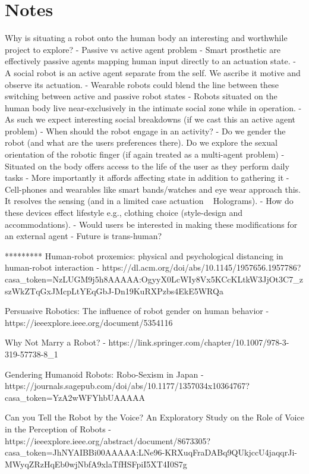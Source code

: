 \section{Notes}

Why is situating a robot onto the human body an interesting and worthwhile project to explore?
- Passive vs active agent problem
    - Smart prosthetic are effectively passive agents mapping human input directly to an actuation state.
    - A social robot is an active agent separate from the self. We ascribe it motive and observe its actuation. 
    - Wearable robots could blend the line between these switching between active and passive robot states
- Robots situated on the human body live near-exclusively in the intimate social zone while in operation.
    - As such we expect interesting social breakdowns (if we cast this an active agent problem)
        - When should the robot engage in an activity? 
    - Do we gender the robot (and what are the users preferences there). Do we explore the sexual orientation of the robotic finger (if again treated as a multi-agent problem)
- Situated on the body offers access to the life of the user as they perform daily tasks
    - More importantly it affords affecting state in addition to gathering it
    - Cell-phones and wearables like smart bands/watches and eye wear approach this. It resolves the sensing (and in a limited case actuation ~ Holograms).
- How do these devices effect lifestyle e.g., clothing choice (style-design and accommodations). 
    - Would users be interested in making these modifications for an external agent
- Future is trans-human?

********* Human-robot proxemics: physical and psychological distancing in human-robot interaction - https://dl.acm.org/doi/abs/10.1145/1957656.1957786?casa_token=NzLUGM9j5h8AAAAA:OgyyX0LcWIy8Vx5KCcKLtkW3JjOt3C7_zszWkZTqGxJMcpLtYEqGbJ-Dn19KuRXPzbs4EkE5WRQa


Persuasive Robotics: The influence of robot gender on human behavior - https://ieeexplore.ieee.org/document/5354116

Why Not Marry a Robot? - https://link.springer.com/chapter/10.1007/978-3-319-57738-8_1

Gendering Humanoid Robots: Robo-Sexism in Japan - https://journals.sagepub.com/doi/abs/10.1177/1357034x10364767?casa_token=YzA2wWFYhbUAAAAA%

Can you Tell the Robot by the Voice? An Exploratory Study on the Role of Voice in the Perception of Robots - https://ieeexplore.ieee.org/abstract/document/8673305?casa_token=JhNYAIBBi00AAAAA:LNe96-KRXuqFraDABq9QUkjccU4jaqqrJi-MWyqZRzHqEb0wjNbfA9xlaTfHSFpiI5XT4I0S7g

